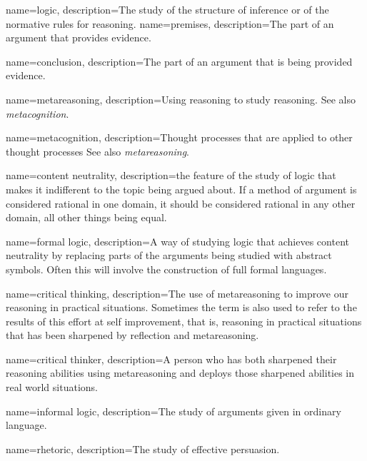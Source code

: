 {
name=logic,
description={The study of the structure of inference or of the normative rules for reasoning.}
}
{
name=premises,
description={The part of an argument that provides evidence.}
}

{
name=conclusion,
description={The part of an argument that is being provided evidence.}
}

{
name=metareasoning,
description={Using reasoning to study reasoning. See also \emph{metacognition}.}
}

{
name=metacognition,
description={Thought processes that are applied to other thought processes See also \emph{metareasoning}.}
}

{
name=content neutrality,
description={the feature of the study of logic that makes it indifferent to the topic being argued about. If a method of argument is considered rational in one domain, it should be considered rational in any other domain, all other things being equal.}
}

{
name=formal logic,
description={A way of studying logic that achieves content neutrality by replacing parts of the arguments being studied with abstract symbols. Often this will involve the construction of full formal languages.}
}

{
name=critical thinking,
description={The use of metareasoning to improve our reasoning in practical situations. Sometimes the term is also used to refer to the results of this effort at self improvement, that is, reasoning in practical situations that has been sharpened by reflection and metareasoning.}
}

{
name=critical thinker,
description={A person who has both sharpened their reasoning abilities using metareasoning and deploys those sharpened abilities in real world situations.}
}

{
name=informal logic,
description={The study of arguments given in ordinary language.}
}

{
name=rhetoric,
description={The study of effective persuasion.}
}


